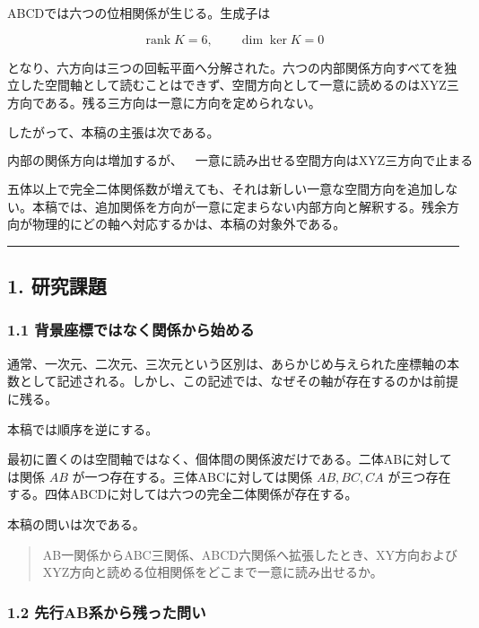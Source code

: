 \documentclass[
  10pt,
  a4paper,
]{article}
\begin{document}
ABCDでは六つの位相関係が生じる。生成子は

\[
\operatorname{rank}K=6,
\qquad
\dim\ker K=0
\]

となり、六方向は三つの回転平面へ分解された。六つの内部関係方向すべてを独立した空間軸として読むことはできず、空間方向として一意に読めるのはXYZ三方向である。残る三方向は一意に方向を定められない。

したがって、本稿の主張は次である。

\[
\boxed{
\text{内部の関係方向は増加するが、}
\quad
\text{一意に読み出せる空間方向はXYZ三方向で止まる}
}
\]

五体以上で完全二体関係数が増えても、それは新しい一意な空間方向を追加しない。本稿では、追加関係を方向が一意に定まらない内部方向と解釈する。残余方向が物理的にどの軸へ対応するかは、本稿の対象外である。

\begin{center}\rule{0.5\linewidth}{0.5pt}\end{center}

\subsection{1. 研究課題}\label{ux7814ux7a76ux8ab2ux984c}

\subsubsection{1.1
背景座標ではなく関係から始める}\label{ux80ccux666fux5ea7ux6a19ux3067ux306fux306aux304fux95a2ux4fc2ux304bux3089ux59cbux3081ux308b}

通常、一次元、二次元、三次元という区別は、あらかじめ与えられた座標軸の本数として記述される。しかし、この記述では、なぜその軸が存在するのかは前提に残る。

本稿では順序を逆にする。

最初に置くのは空間軸ではなく、個体間の関係波だけである。二体ABに対しては関係
\(AB\) が一つ存在する。三体ABCに対しては関係 \(AB,BC,CA\)
が三つ存在する。四体ABCDに対しては六つの完全二体関係が存在する。

本稿の問いは次である。

\begin{quote}
AB一関係からABC三関係、ABCD六関係へ拡張したとき、XY方向およびXYZ方向と読める位相関係をどこまで一意に読み出せるか。
\end{quote}

\subsubsection{1.2
先行AB系から残った問い}\label{ux5148ux884cabux7cfbux304bux3089ux6b8bux3063ux305fux554fux3044}
\end{document}
